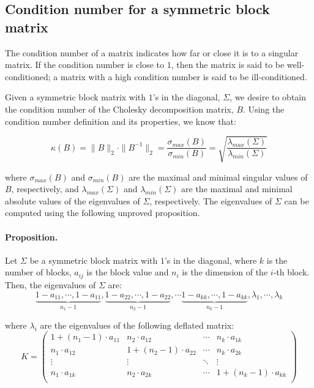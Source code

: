 \documentclass[a4paper,12pt,final]{article}
\begin{document}
\subsection{Condition number for a symmetric block matrix}
\label{ap:condnum}

The condition number of a matrix indicates how far or close it is to a singular 
matrix. If the condition number is close to $1$, then the matrix is said to be 
well-conditioned; a matrix with a high condition number is said to be 
ill-conditioned.
\newline

Given a symmetric block matrix with $1$'s in the diagonal, $\Sigma$, we desire 
to obtain the condition number of the Cholesky decomposition matrix, $B$.
Using the condition number definition and its properties, we know that:

\begin{displaymath}
\kappa(B) = \|B\|_2 \cdot \|B^{-1}\|_2 
= \frac{\sigma_{max}(B)}{\sigma_{min}(B)}
= \sqrt{\frac{\lambda_{max}(\Sigma)}{\lambda_{min}(\Sigma)}}
\end{displaymath}

where $\sigma_{max}(B)$ and $\sigma_{min}(B)$ are the maximal and minimal singular 
values of $B$, respectively, and $\lambda_{max}(\Sigma)$ and $\lambda_{min}(\Sigma)$ 
are the maximal and minimal absolute values of the eigenvalues of $\Sigma$, respectively.
The eigenvalues of $\Sigma$ can be computed using the following unproved proposition.

\paragraph{Proposition.} Let $\Sigma$ be a symmetric block matrix with 
$1$'s in the diagonal, where $k$ is the number of blocks, $a_{ij}$ is the block 
value and $n_i$ is the dimension of the $i$-th block. Then, the eigenvalues 
of $\Sigma$ are:
\begin{displaymath}
\underbrace{1-a_{11}, \cdots, 1-a_{11}}_{n_1-1},
\underbrace{1-a_{22}, \cdots, 1-a_{22}}_{n_2-1},  
\cdots
\underbrace{1-a_{kk}, \cdots, 1-a_{kk}}_{n_k-1},  
\lambda_1, \cdots, \lambda_k
\end{displaymath}

where $\lambda_i$ are the eigenvalues of the following deflated matrix:
\begin{displaymath}
K = \left(
\begin{array}{cccc}
1+(n_1-1) \cdot a_{11} & n_2 \cdot a_{12}       & \cdots & n_k \cdot a_{1k}       \\
      n_1 \cdot a_{12} & 1+(n_2-1) \cdot a_{22} & \cdots & n_k \cdot a_{2k}       \\
\vdots                 & \vdots                 & \ddots & \vdots                 \\
n_1 \cdot a_{1k}       & n_2 \cdot a_{2k}       & \cdots & 1+(n_k-1) \cdot a_{kk} \\
\end{array}
\right)
\end{displaymath}
\end{document}
